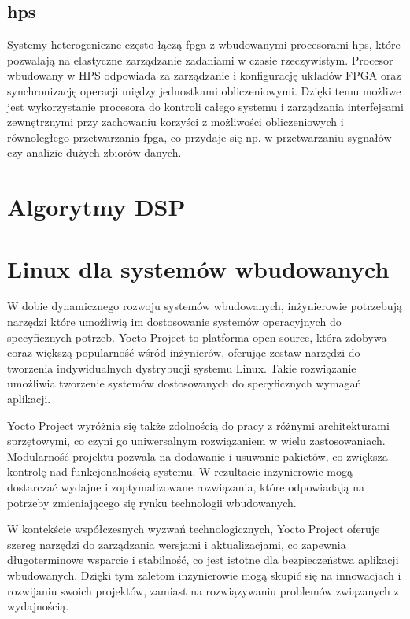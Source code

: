 \subsection{\ac{hps}}
Systemy heterogeniczne często łączą \ac{fpga} z wbudowanymi procesorami \ac{hps}, które pozwalają na elastyczne zarządzanie zadaniami w czasie rzeczywistym. Procesor wbudowany w HPS odpowiada za zarządzanie i konfigurację układów FPGA oraz synchronizację operacji między jednostkami obliczeniowymi. Dzięki temu możliwe jest wykorzystanie procesora do kontroli całego systemu i zarządzania interfejsami zewnętrznymi przy zachowaniu korzyści z możliwości obliczeniowych i równoległego przetwarzania \ac{fpga}, co przydaje się np. w przetwarzaniu sygnałów czy analizie dużych zbiorów danych.


\section{Algorytmy DSP}
\label{sec:algorytmy-dsp}

\section{Linux dla systemów wbudowanych}
\label{sec:linux-embedded}

W dobie dynamicznego rozwoju systemów wbudowanych, inżynierowie potrzebują narzędzi które umożliwią im dostosowanie systemów operacyjnych do specyficznych potrzeb. Yocto Project to platforma open source, która zdobywa coraz większą popularność wśród inżynierów, oferując zestaw narzędzi do tworzenia indywidualnych dystrybucji systemu Linux. Takie rozwiązanie umożliwia tworzenie systemów dostosowanych do specyficznych wymagań aplikacji.

Yocto Project wyróżnia się także zdolnością do pracy z różnymi architekturami sprzętowymi, co czyni go uniwersalnym rozwiązaniem w wielu zastosowaniach. Modularność projektu pozwala na dodawanie i usuwanie pakietów, co zwiększa kontrolę nad funkcjonalnością systemu. W rezultacie inżynierowie mogą dostarczać wydajne i zoptymalizowane rozwiązania, które odpowiadają na potrzeby zmieniającego się rynku technologii wbudowanych.

W kontekście współczesnych wyzwań technologicznych, Yocto Project oferuje szereg narzędzi do zarządzania wersjami i aktualizacjami, co zapewnia długoterminowe wsparcie i stabilność, co jest istotne dla bezpieczeństwa aplikacji wbudowanych. Dzięki tym zaletom inżynierowie mogą skupić się na innowacjach i rozwijaniu swoich projektów, zamiast na rozwiązywaniu problemów związanych z wydajnością.




